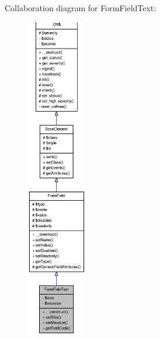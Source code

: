 Collaboration diagram for FormFieldText:\nopagebreak
\begin{figure}[H]
\begin{center}
\leavevmode
\includegraphics[height=400pt]{classFormFieldText__coll__graph}
\end{center}
\end{figure}
